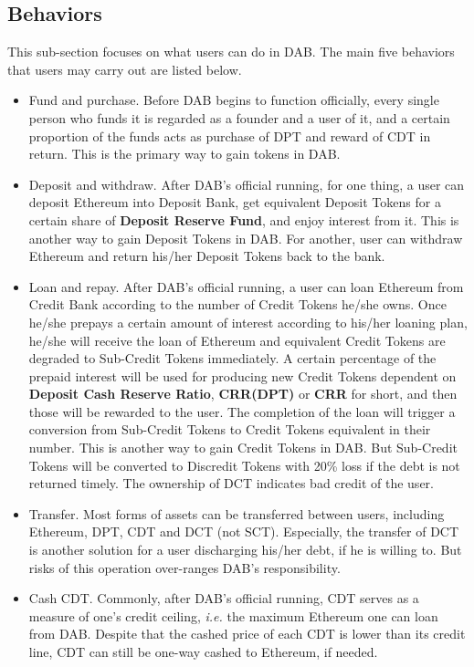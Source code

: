 \documentclass[review]{elsarticle}
\begin{document}
\subsection{Behaviors}
This sub-section focuses on what users can do in DAB. The main five behaviors that users may carry out are listed below.

\begin{itemize}
   \item Fund and purchase. Before DAB begins to function officially, every single person who funds it is regarded as a founder and a user of it, and a certain proportion of the funds acts as purchase of DPT and reward of CDT in return. This is the primary way to gain tokens in DAB.
   \item Deposit and withdraw. After DAB's official running, for one thing, a user can deposit Ethereum into Deposit Bank, get equivalent Deposit Tokens for a certain share of \textbf{Deposit Reserve Fund}, and enjoy interest from it. This is another way to gain Deposit Tokens in DAB. For another, user can withdraw Ethereum and return his/her Deposit Tokens back to the bank.
   \item Loan and repay. After DAB's official running, a user can loan Ethereum from Credit Bank according to the number of Credit Tokens he/she owns. Once he/she prepays a certain amount of interest according to his/her loaning plan, he/she will receive the loan of Ethereum and equivalent Credit Tokens are degraded to Sub-Credit Tokens immediately. A certain percentage of the prepaid interest will be used for producing new Credit Tokens dependent on \textbf{Deposit Cash Reserve Ratio}, \textbf{CRR(DPT)} or \textbf{CRR} for short, and then those will be rewarded to the user. The completion of the loan will trigger a conversion from Sub-Credit Tokens to Credit Tokens equivalent in their number. This is another way to gain Credit Tokens in DAB. But Sub-Credit Tokens will be converted to Discredit Tokens with 20\% loss if the debt is not returned timely. The ownership of DCT indicates bad credit of the user.
   \item Transfer. Most forms of assets can be transferred between users, including Ethereum, DPT, CDT and DCT (not SCT). Especially, the transfer of DCT is another solution for a user discharging his/her debt, if he is willing to. But risks of this operation over-ranges DAB's responsibility.
   \item Cash CDT. Commonly, after DAB's official running, CDT serves as a measure of one's credit ceiling, \emph{i.e.} the maximum Ethereum one can loan from DAB. Despite that the cashed price of each CDT is lower than its credit line, CDT can still be one-way cashed to Ethereum, if needed.
\end{itemize}
\end{document}
